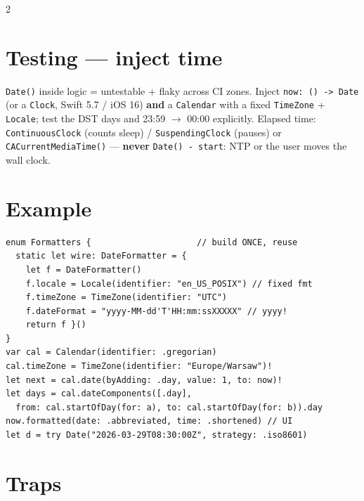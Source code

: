 \documentclass[8pt]{extarticle}
\begin{document}
\begin{multicols}{2}
\section{Testing — inject time}
\texttt{Date()} inside logic = untestable + flaky across CI zones. Inject
\texttt{now: ()~\hbox{-}\hbox{>}~Date} (or a \texttt{Clock}, Swift 5.7 / iOS 16) \textbf{and} a
\texttt{Calendar} with a fixed \texttt{TimeZone} + \texttt{Locale}; test the DST days
and 23:59 $\to$ 00:00 explicitly. Elapsed time: \texttt{ContinuousClock} (counts
sleep) / \texttt{SuspendingClock} (pauses) or \texttt{CACurrentMediaTime()} —
\textbf{never} \texttt{Date() - start}: NTP or the user moves the wall clock.

\columnbreak

\section{Example}
\begin{lstlisting}[language=SwiftSheet]
enum Formatters {                     // build ONCE, reuse
  static let wire: DateFormatter = {
    let f = DateFormatter()
    f.locale = Locale(identifier: "en_US_POSIX") // fixed fmt
    f.timeZone = TimeZone(identifier: "UTC")
    f.dateFormat = "yyyy-MM-dd'T'HH:mm:ssXXXXX" // yyyy!
    return f }()
}
var cal = Calendar(identifier: .gregorian)
cal.timeZone = TimeZone(identifier: "Europe/Warsaw")!
let next = cal.date(byAdding: .day, value: 1, to: now)!
let days = cal.dateComponents([.day],
  from: cal.startOfDay(for: a), to: cal.startOfDay(for: b)).day
now.formatted(date: .abbreviated, time: .shortened) // UI
let d = try Date("2026-03-29T08:30:00Z", strategy: .iso8601)
\end{lstlisting}

\section{Traps}
\begin{itemize}
\end{itemize}


\end{multicols}
\end{document}
